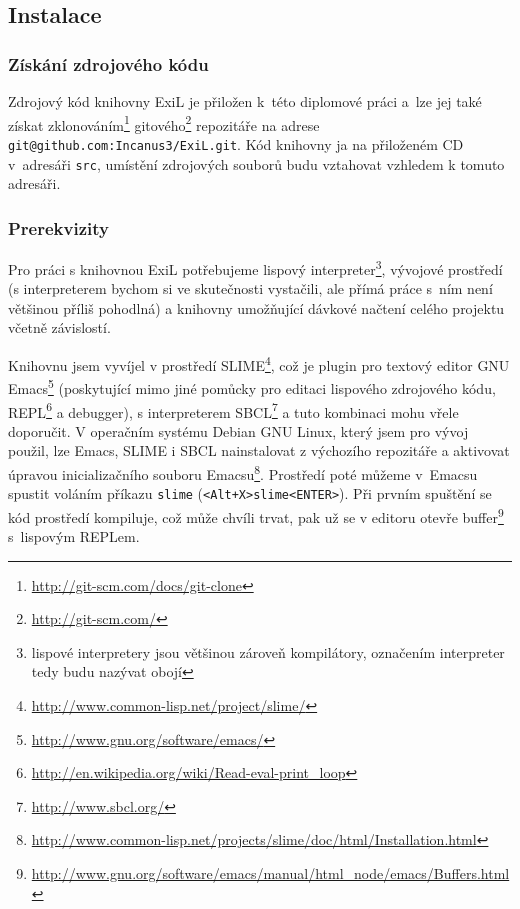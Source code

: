 \subsection{Instalace}
\subsubsection{Získání zdrojového kódu}
Zdrojový kód knihovny ExiL je přiložen k~této diplomové práci a~lze jej také získat
zklonováním\footnote{\url{http://git-scm.com/docs/git-clone}}
gitového\footnote{\url{http://git-scm.com/}} repozitáře na adrese
\verb|git@github.com:Incanus3/ExiL.git|.
Kód knihovny ja na přiloženém CD v~adresáři \verb|src|, umístění zdrojových
souborů budu vztahovat vzhledem k tomuto adresáři.

\subsubsection{Prerekvizity}
Pro práci s knihovnou ExiL potřebujeme lispový
interpreter\footnote{lispové interpretery jsou většinou zároveň
kompilátory, %
označením interpreter tedy budu nazývat obojí}, vývojové prostředí (s
interpreterem bychom si ve skutečnosti vystačili, ale přímá práce s~ním není
většinou příliš pohodlná) a knihovny umožňující dávkové načtení celého projektu
včetně závislostí.

Knihovnu jsem vyvíjel v prostředí
SLIME\footnote{\url{http://www.common-lisp.net/project/slime/}}, což je plugin
pro textový editor GNU Emacs\footnote{\url{http://www.gnu.org/software/emacs/}}
(poskytující mimo jiné pomůcky pro editaci lispového zdrojového kódu,
REPL\footnote{\url{http://en.wikipedia.org/wiki/Read-eval-print\_loop}} a
debugger), s interpreterem SBCL\footnote{\url{http://www.sbcl.org/}} a tuto
kombinaci mohu vřele doporučit. V operačním systému Debian GNU Linux, který jsem
pro vývoj použil, lze Emacs, SLIME i SBCL nainstalovat z výchozího repozitáře a
aktivovat úpravou inicializačního souboru
Emacsu\footnote{\url{http://www.common-lisp.net/projects/slime/doc/html/Installation.html}}.
Prostředí poté můžeme v~Emacsu spustit voláním příkazu \verb|slime|
(\verb|<Alt+X>slime<ENTER>|). Při prvním spuštění se kód prostředí kompiluje, což
může chvíli trvat, pak už se v editoru otevře
buffer\footnote{\url{http://www.gnu.org/software/emacs/manual/html\_node/emacs/Buffers.html}}
s~lispovým REPLem.

